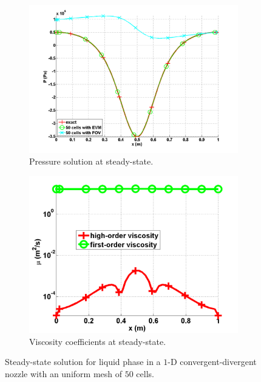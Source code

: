 \documentclass[preprint,10pt]{elsarticle}
\begin{document}
\begin{figure}[H]
\begin{subfigure}[b]{0.495\textwidth}
                \label{fig:1d_nozzle_liq_density}
        \end{subfigure}
        \begin{subfigure}[b]{0.495\textwidth}
                \centering
                \includegraphics[width=\textwidth]{liquid_pressure_numerical_and_exact_50.png}
                \caption{Pressure solution at steady-state.}
                \label{fig:1d_nozzle_liq_press}
        \end{subfigure}
        \begin{subfigure}[b]{0.495\textwidth}
                \centering
                \includegraphics[width=\textwidth]{liquid_viscosity_numerical50.png}
                \caption{Viscosity coefficients at steady-state.}
                \label{fig:1d_nozzle_liq_visc}
        \end{subfigure}
        \caption{Steady-state solution for liquid phase in a $1$-D convergent-divergent nozzle with an uniform mesh of $50$ cells.}\label{fig:1d_liq_nozzle}
\end{figure}
\end{document}
